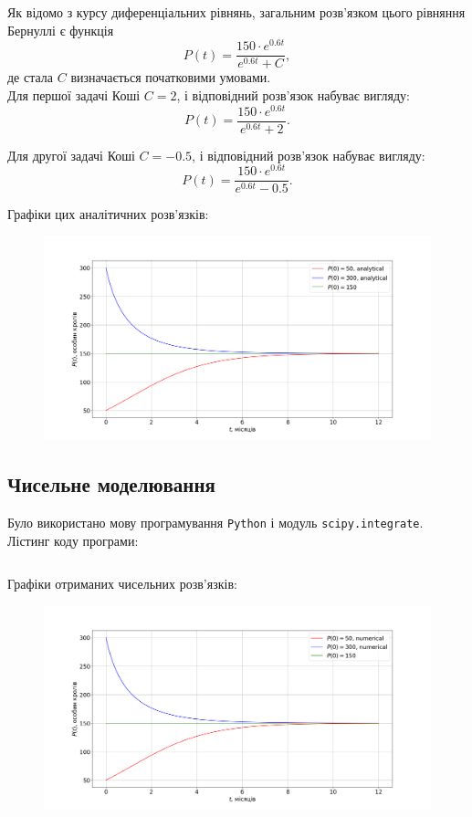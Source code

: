 Як відомо з курсу диференціальних рівнянь, загальним розв'язком цього рівняння Бернуллі є функція
\begin{equation*}
	P(t) = \frac{150 \cdot e^{0.6 t}}{e^{0.6 t} + C},
\end{equation*}
де стала $C$ визначається початковими умовами. \\

Для першої задачі Коші $C = 2$, і відповідний розв'язок набуває вигляду:
\begin{equation*}
	P(t) = \frac{150 \cdot e^{0.6 t}}{e^{0.6 t} + 2}.
\end{equation*}

Для другої задачі Коші $C = - 0.5$, і відповідний розв'язок набуває вигляду:
\begin{equation*}
	P(t) = \frac{150 \cdot e^{0.6 t}}{e^{0.6 t} - 0.5}.
\end{equation*}

Графіки цих аналітичних розв'язків:
\begin{figure}[H]
	\centering
	\includegraphics[width=\textwidth]{1_analytical.png}
\end{figure}

\subsection{Чисельне моделювання}

Було використано мову програмування \texttt{Python} і модуль \texttt{scipy.integrate}. Лістинг коду програми:
\inputminted{python}{1_numerical.py}

Графіки отриманих чисельних розв'язків:
\begin{figure}[H]
	\centering
	\includegraphics[width=\textwidth]{1_numerical.png}
\end{figure}

